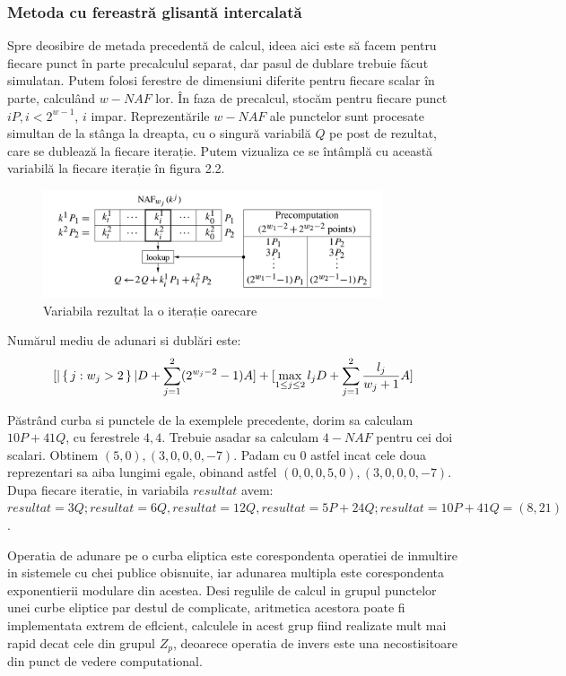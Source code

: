 \subsubsection{Metoda cu fereastră glisantă intercalată}

Spre deosibire de metada precedentă de calcul, ideea aici este să facem pentru fiecare punct în parte precalculul separat, dar pasul de dublare trebuie făcut simulatan. Putem folosi ferestre de dimensiuni diferite pentru fiecare scalar în parte, calculând $w-NAF$ lor. În faza de precalcul, stocăm pentru fiecare punct $iP, i<2^{w-1}$, $i$ impar. Reprezentările $w-NAF$ ale punctelor sunt procesate simultan de la stânga la dreapta, cu o singură variabilă $Q$ pe post de rezultat, care se dublează la fiecare iterație. Putem vizualiza ce se întâmplă cu această variabilă la fiecare iterație  în figura 2.2.

\begin{figure}[htp]
\centering
\includegraphics[width=10cm]{chapters/interleaving.png}
\caption{Variabila rezultat la o iterație oarecare}
\label{fig:lion}
\end{figure}

\begin{obs}
Numărul mediu de adunari si dublări este:
$$[|\set{j:w_j>2}|D+\sum_{j=1}^{2}(2^{w_j-2}-1)A]+[\max_{1\leq j\leq 2} l_jD + \sum_{j=1}^{2}\frac{l_j}{w_j+1}A]$$
\end{obs}

\begin{ex}
Păstrând curba si punctele de la exemplele precedente, dorim sa calculam $10P + 41Q$, cu ferestrele $4, 4$. Trebuie asadar sa calculam $4-NAF$ pentru cei doi scalari. Obtinem $(5, 0), (3, 0, 0, 0, -7)$. Padam cu 0 astfel incat cele doua reprezentari sa aiba lungimi egale, obinand astfel $(0, 0, 0, 5, 0), (3, 0, 0, 0, -7)$. Dupa fiecare iteratie, in variabila $resultat$ avem: $resultat = 3Q; resultat = 6Q, resultat=12Q, resultat = 5P + 24Q; resultat = 10P + 41Q = (8, 21)$.
\end{ex}


\begin{obs}
Operatia de adunare pe o curba eliptica este corespondenta operatiei de inmultire
in sistemele cu chei publice obisnuite, iar adunarea multipla este corespondenta
exponentierii modulare din acestea.
Desi regulile de calcul in grupul punctelor unei curbe eliptice par destul de complicate, aritmetica acestora poate fi implementata extrem de eflcient, calculele in acest grup fiind realizate mult mai rapid decat cele din grupul $Z_p$, deoarece operatia de invers este una necostisitoare din punct de vedere computational.
\end{obs}




